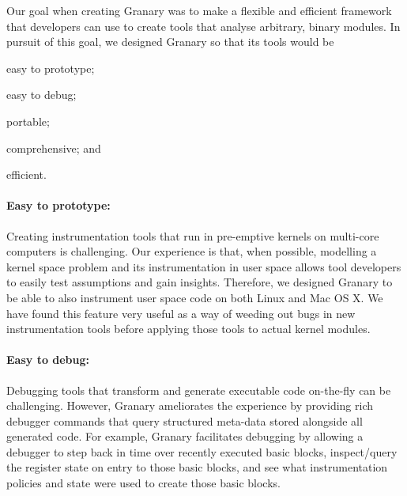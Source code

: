 \documentclass[letterpaper,twocolumn,10pt]{article}
\begin{document}
Our goal when creating Granary was to make a flexible and efficient framework that developers can use to create tools that analyse arbitrary, binary modules. In pursuit of this goal, we designed Granary so that its tools would be \begin{inparaenum}[i)]
	\item easy to prototype;
	\item easy to debug;
	\item portable;
	\item comprehensive; and
	\item efficient.
\end{inparaenum}



\paragraph{Easy to prototype:} Creating instrumentation tools that run in pre-emptive kernels on multi-core computers is challenging. Our experience is that, when possible, modelling a kernel space problem and its instrumentation in user space allows tool developers to easily test assumptions and gain insights. Therefore, we designed Granary to be able to also instrument user space code on both Linux and Mac OS X. We have found this feature very useful as a way of weeding out bugs in new instrumentation tools before applying those tools to actual kernel modules.


\paragraph{Easy to debug:} Debugging tools that transform and generate executable code on-the-fly can be challenging. However, Granary ameliorates the experience by providing rich debugger commands that query structured meta-data stored alongside all generated code. For example, Granary facilitates debugging by allowing a debugger to step back in time over recently executed basic blocks, inspect/query the register state on entry to those basic blocks, and see what instrumentation policies and state were used to create those basic blocks.
\end{document}
